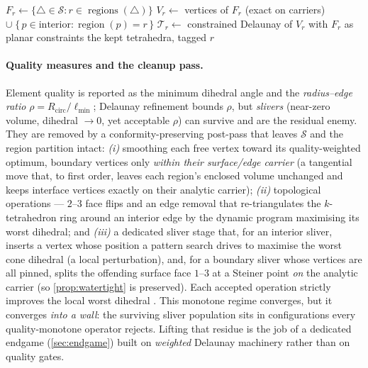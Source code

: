 \documentclass[11pt,a4paper]{article}
\numberwithin{equation}{section}
\begin{document}
\begin{algorithm}[H]
\caption{\textsc{MeshRegion}$(\mathcal{S},r,\text{interior})$: per-region
constrained fill (straddler-free by construction)}
\label{alg:region}
$F_r\gets\{\triangle\in\mathcal{S}: r\in\operatorname{regions}(\triangle)\}$
   \hfill{}\;
$V_r\gets$ vertices of $F_r$ (exact on carriers) $\cup\;
   \{\,p\in\text{interior}:\operatorname{region}(p)=r\,\}$\;
$\mathcal{T}_r\gets$ constrained Delaunay of $V_r$ with $F_r$ as planar
   constraints\;
\Return the kept tetrahedra, tagged $r$
   \hfill{}\;
\end{algorithm}

\paragraph{Quality measures and the cleanup pass.}
Element quality is reported as the minimum dihedral angle and the
\emph{radius--edge ratio} $\rho=R_{\text{circ}}/\ell_{\min}$; Delaunay refinement
bounds $\rho$, but \emph{slivers} (near-zero volume, dihedral $\to0$, yet
acceptable $\rho$) can survive and are the residual enemy. They are removed by a
conformity-preserving post-pass that leaves $\mathcal{S}$ and the region partition
intact: \emph{(i)} smoothing each free vertex toward its quality-weighted optimum,
boundary vertices only \emph{within their surface/edge carrier} (a tangential move
that, to first order, leaves each region's enclosed volume unchanged and keeps
interface vertices exactly on their analytic carrier); \emph{(ii)} topological
operations --- $2$--$3$ face flips and an edge removal that re-triangulates the
$k$-tetrahedron ring around an interior edge by the dynamic program maximising its
worst dihedral; and \emph{(iii)} a dedicated sliver stage that, for an interior
sliver, inserts a vertex whose position a pattern search drives to maximise the
worst cone dihedral (a local perturbation), and, for a boundary sliver whose
vertices are all pinned, splits the offending surface face $1$--$3$ at a Steiner
point \emph{on} the analytic carrier (so \cref{prop:watertight} is preserved).
Each accepted operation strictly improves the local worst dihedral
\cite{TournoisAlliez2009,AlliezCohenSteiner2005}. This
monotone regime converges, but it converges \emph{into a wall}: the surviving
sliver population sits in configurations every quality-monotone operator
rejects. Lifting that residue is the job of a dedicated endgame
(\cref{sec:endgame}) built on \emph{weighted} Delaunay machinery rather than on
quality gates.
\end{document}

